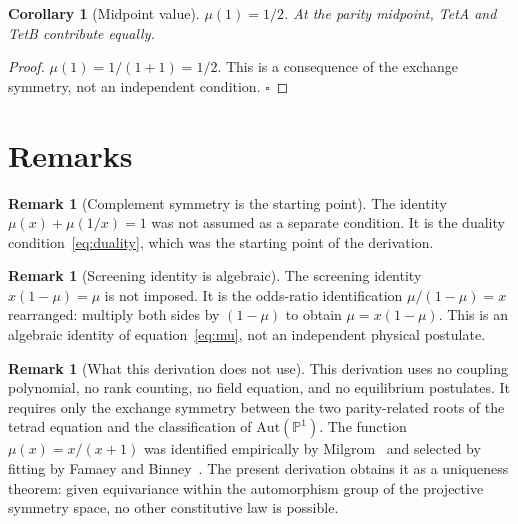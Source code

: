 \documentclass[twocolumn]{iopjournal}
\newtheorem{corollary}[lemma]{Corollary}
\theoremstyle{definition}
\newtheorem{remark}[lemma]{Remark}
\begin{document}
\begin{corollary}[Midpoint value]
\label{cor:midpoint}
$\mu(1) = 1/2$.  At the parity midpoint, TetA and TetB
contribute equally.
\end{corollary}

\begin{proof}
$\mu(1) = 1/(1 + 1) = 1/2$.  This is a consequence of the
exchange symmetry, not an independent condition.
\hfill$\square$
\end{proof}


\section*{Remarks}

\begin{remark}[Complement symmetry is the starting point]
\label{rem:complement}
The identity $\mu(x) + \mu(1/x) = 1$ was not assumed as a
separate condition.  It is the duality
condition~\eqref{eq:duality}, which was the starting point of
the derivation.
\end{remark}

\begin{remark}[Screening identity is algebraic]
\label{rem:screening}
The screening identity $x(1 - \mu) = \mu$ is not imposed.  It
is the odds-ratio identification $\mu/(1-\mu) = x$ rearranged:
multiply both sides by $(1-\mu)$ to obtain $\mu = x(1-\mu)$.
This is an algebraic identity of equation~\eqref{eq:mu}, not an
independent physical postulate.
\end{remark}

\begin{remark}[What this derivation does not use]
\label{rem:independence}
This derivation uses no coupling polynomial, no rank counting,
no field equation, and no equilibrium postulates.  It requires
only the exchange symmetry between the two parity-related roots
of the tetrad equation and the classification of
$\mathrm{Aut}(\mathbb{P}^1)$.  The function
$\mu(x) = x/(x+1)$ was identified empirically by
Milgrom~\cite{Milgrom1983} and selected by fitting by Famaey
and Binney~\cite{FamaeyBinney2005}.  The present derivation
obtains it as a uniqueness theorem: given equivariance within
the automorphism group of the projective symmetry space, no
other constitutive law is possible.
\end{remark}

\end{document}
